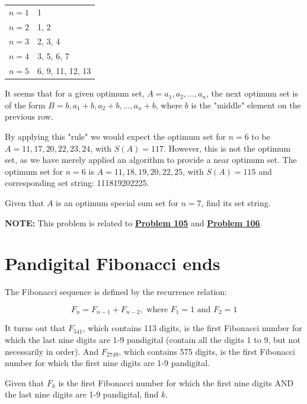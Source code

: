 \begin{center}
    \begin{tabular}{cl}
        $n = 1$ & {1}\\
        $n = 2$ & {1, 2}\\
        $n = 3$ & {2, 3, 4}\\
        $n = 4$ & {3, 5, 6, 7}\\
        $n = 5$ & {6, 9, 11, 12, 13}\\
    \end{tabular}
\end{center}

It seems that for a given optimum set, $A = {a_1, a_2, ... , a_n}$, the next optimum set is of the form $B = {b, a_1+b, a_2+b, ... ,a_n+b}$, where $b$ is the "middle" element on the previous row.
\medskip

By applying this "rule" we would expect the optimum set for $n = 6$ to be $A = {11, 17, 20, 22, 23, 24}$, with $S(A) = 117$. However, this is not the optimum set, as we have merely applied an algorithm to provide a near optimum set. The optimum set for $n = 6$ is $A = {11, 18, 19, 20, 22, 25}$, with $S(A) = 115$ and corresponding set string: 111819202225.
\medskip

Given that $A$ is an optimum special sum set for $n = 7$, find its set string.
\medskip

\textbf{NOTE:} This problem is related to \hyperref[pb.0105]{\textbf{Problem 105}} and \hyperref[pb.0106]{\textbf{Problem 106}}.


\section{Pandigital Fibonacci ends} \label{pb.0104}

The Fibonacci sequence is defined by the recurrence relation:

$$F_n = F_{n-1} + F_{n-2}, \text{ where } F_1 = 1 \text{ and } F_2 = 1$$

It turns out that $F_{541}$, which contains 113 digits, is the first Fibonacci number for which the last nine digits are 1-9 pandigital (contain all the digits 1 to 9, but not necessarily in order). And $F_{2749}$, which contains 575 digits, is the first Fibonacci number for which the first nine digits are 1-9 pandigital.
\medskip

Given that $F_k$ is the first Fibonacci number for which the first nine digits AND the last nine digits are 1-9 pandigital, find $k$.

